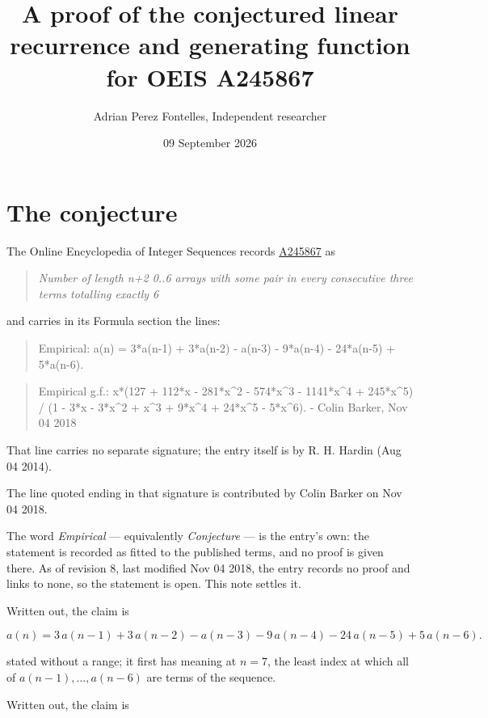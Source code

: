 \documentclass[11pt]{article}
\title{A proof of the conjectured linear recurrence and generating function for OEIS A245867}
\author{Adrian Perez Fontelles, Independent researcher}
\date{09 September 2026}
\theoremstyle{definition}
\begin{document}
\maketitle
\section{The conjecture}

The Online Encyclopedia of Integer Sequences records \href{https://oeis.org/A245867}{A245867} as

\begin{quote}\itshape Number of length n+2 0..6 arrays with some pair in every consecutive three terms totalling exactly 6\end{quote}

and carries in its Formula section the lines:

\begin{quote}\ttfamily Empirical: a(n) = 3*a(n-1) + 3*a(n-2) - a(n-3) - 9*a(n-4) - 24*a(n-5) + 5*a(n-6).\end{quote}

\begin{quote}\ttfamily Empirical g.f.: x*(127 + 112*x - 281*x\textasciicircum{}2 - 574*x\textasciicircum{}3 - 1141*x\textasciicircum{}4 + 245*x\textasciicircum{}5) / (1 - 3*x - 3*x\textasciicircum{}2 + x\textasciicircum{}3 + 9*x\textasciicircum{}4 + 24*x\textasciicircum{}5 - 5*x\textasciicircum{}6). - Colin Barker, Nov 04 2018\end{quote}

That line carries no separate signature; the entry itself is by R. H. Hardin (Aug 04 2014).

The line quoted ending in that signature is contributed by Colin Barker on Nov 04 2018.

The word {\itshape Empirical} --- equivalently {\itshape Conjecture} --- is the entry's own: the statement is recorded as fitted to the published terms, and no proof is given there. As of revision 8, last modified Nov 04 2018, the entry records no proof and links to none, so the statement is open. This note settles it.

Written out, the claim is

\[a(n) = 3\,a(n-1) + 3\,a(n-2) - a(n-3) - 9\,a(n-4) - 24\,a(n-5) + 5\,a(n-6).\]

stated without a range; it first has meaning at $n = 7$, the least index at which all of $a(n-1),\dots,a(n-6)$ are terms of the sequence.

Written out, the claim is
\end{document}

